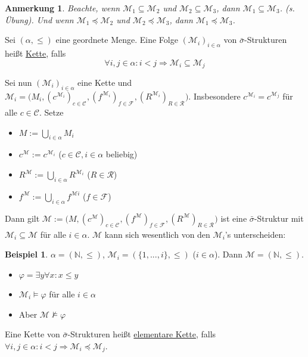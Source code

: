 \documentclass{article}
\theoremstyle{definition}
\newtheorem*{bsp}{Beispiel}
\theoremstyle{plain}
\newtheorem*{anm}{Anmerkung}
\newcommand{\m}[1]{\mathcal{#1}}
\newcommand{\struc}[3]{\big(#1, (c^{#2})_{c \in \m{C}_{#3}}, (f^{#2})_{f \in \m{F}_{#3}}, (R^{#2})_{R \in \m{R}_{#3}}\big)}
\begin{document}
    \begin{anm}
        Beachte, wenn $ \m{M}_1 \subseteq \m{M}_2 $ und $ \m{M}_2 \subseteq \m{M}_3 $, dann $ \m{M}_1 \subseteq \m{M}_3 $. (s. Übung).
        Und wenn $ \m{M}_1 \preceq \m{M}_2 $ und $ \m{M}_2 \preceq \m{M}_3 $, dann $ \m{M}_1 \preceq \m{M}_3 $.
    \end{anm}

    Sei $ (\alpha, \leq) $ eine geordnete Menge.
    Eine Folge $ (\m{M}_i)_{i \in \alpha} $ von $ \bar{\sigma} $-Strukturen heißt \underline{Kette}, falls
    \begin{equation*}
        \forall i, j \in \alpha: i < j \Rightarrow \m{M}_i \subseteq \m{M}_j
    \end{equation*}

    Sei nun $ (\m{M}_i)_{i \in \alpha} $ eine Kette und $ \m{M}_i = \struc{M_i}{\m{M}_i}{} $.
    Insbesondere $ c^{\m{M}_i} = c^{\m{M}_j} $ für alle $ c \in \m{C} $.
    Setze
    \begin{itemize}
        \item $ M := \bigcup_{i \in \alpha} M_i $
        \item $ c^\m{M} := c^{\m{M}_i} $ \hfill ($ c \in \m{C}, i \in \alpha $ beliebig)
        \item $ R^\m{M} := \bigcup_{i \in \alpha} R^{\m{M}_i} $ \hfill ($ R \in \m{R} $)
        \item $ f^\m{M} := \bigcup_{i \in \alpha} f^{\m{M}i} $ \hfill ($ f \in \m{F} $)
    \end{itemize}

    Dann gilt $ \m{M} := \struc{M}{\m{M}}{} $ ist eine $ \bar{\sigma} $-Struktur mit $ \m{M}_i \subseteq \m{M} $ für alle $ i \in \alpha $.
    $ \m{M} $ kann sich wesentlich von den $ \m{M}_i $'s unterscheiden:
    \begin{bsp}
        $ \alpha = (\mathbb{N}, \leq) $, $ \m{M}_i = (\{1, ..., i\}, \leq) $ ($ i \in \alpha $).
        Dann $ \m{M} = (\mathbb{N}, \leq) $.
        \begin{itemize}
            \item $ \varphi = \exists y \forall x: x \leq y $
            \item $ \m{M}_i \models \varphi $ für alle $ i \in \alpha $
            \item Aber $ \m{M} \not \models \varphi $
        \end{itemize}
    \end{bsp}

    Eine Kette von $ \bar{\sigma} $-Strukturen heißt \underline{elementare Kette}, falls $ \forall i, j \in \alpha: i < j \Rightarrow \m{M}_i \preceq \m{M}_j $.
\end{document}
